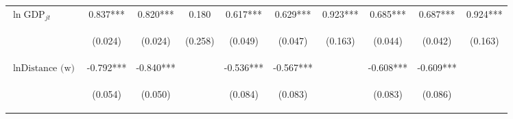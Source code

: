 \begin{center}
\begin{tabular}{lccccccccc}
$\ln\text{GDP}_{jt}$ & 0.837*** & 0.820*** & 0.180 & 0.617*** & 0.629*** & 0.923*** & 0.685*** & 0.687*** & 0.924*** \\
\vspace{4pt} & \begin{footnotesize}(0.024)\end{footnotesize} & \begin{footnotesize}(0.024)\end{footnotesize} & \begin{footnotesize}(0.258)\end{footnotesize} & \begin{footnotesize}(0.049)\end{footnotesize} & \begin{footnotesize}(0.047)\end{footnotesize} & \begin{footnotesize}(0.163)\end{footnotesize} & \begin{footnotesize}(0.044)\end{footnotesize} & \begin{footnotesize}(0.042)\end{footnotesize} & \begin{footnotesize}(0.163)\end{footnotesize} \\
$\ln\text{Distance (w)}$ & -0.792*** & -0.840*** &  & -0.536*** & -0.567*** &  & -0.608*** & -0.609*** &  \\
\vspace{4pt} & \begin{footnotesize}(0.054)\end{footnotesize} & \begin{footnotesize}(0.050)\end{footnotesize} & \begin{footnotesize}\end{footnotesize} & \begin{footnotesize}(0.084)\end{footnotesize} & \begin{footnotesize}(0.083)\end{footnotesize} & \begin{footnotesize}\end{footnotesize} & \begin{footnotesize}(0.083)\end{footnotesize} & \begin{footnotesize}(0.086)\end{footnotesize} & \begin{footnotesize}\end{footnotesize} \\

\end{tabular}
\end{center}
